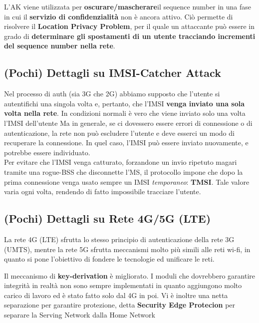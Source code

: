 \begin{corollary}
L'AK viene utilizzata per \textbf{oscurare/mascherare}\footnotemark il sequence number in una fase in cui il \textbf{servizio di confidenzialità} non è ancora attivo. Ciò permette di risolvere il \textbf{Location Privacy Problem}, per il quale un attaccante può essere in grado di \textbf{determinare gli spostamenti di un utente tracciando incrementi del sequence number nella rete}.
\end{corollary}
\subsection{(Pochi) Dettagli su IMSI-Catcher Attack}
Nel processo di auth (sia 3G che 2G) abbiamo supposto che l'utente si autentifichi una singola volta e, pertanto, che l'IMSI \textbf{venga inviato una sola volta nella rete}.
In condizioni normali è vero che viene inviato solo una volta l'IMSI dell'utente
Ma in generale, se ci dovessero essere errori di connessione o di autenticazione, la rete non può escludere l'utente e deve esserci un modo di recuperare la connessione. In quel caso, l'IMSI può essere inviato nuovamente, e potrebbe essere individuato.\\
Per evitare che l'IMSI venga catturato, forzandone un invio ripetuto magari tramite una rogue-BSS che disconnette l'MS, il protocollo impone che dopo la prima connessione venga usato sempre un IMSI \textit{temporaneo}: \textbf{TMSI}. Tale valore varia ogni volta, rendendo di fatto impossibile tracciare l'utente.

\subsection{(Pochi) Dettagli su Rete 4G/5G (LTE)}
La rete 4G (LTE) sfrutta lo stesso principio di autenticazione della rete 3G (UMTS), mentre la rete 5G sfrutta meccanismi molto più simili alle reti wi-fi, in quanto si pone l'obiettivo di fondere le tecnologie ed unificare le reti. 
\begin{remark}[Riguardo 5G]
Il meccanismo di \textbf{key-derivation} è migliorato. I moduli che dovrebbero garantire integrità in realtà non sono sempre implementati in quanto aggiungono molto carico di lavoro ed è stato fatto solo dal 4G in poi. Vi è inoltre una netta separazione per garantire protezione, detta \textbf{Security Edge Protecion} per separare la Serving Network dalla Home Network
\end{remark}
